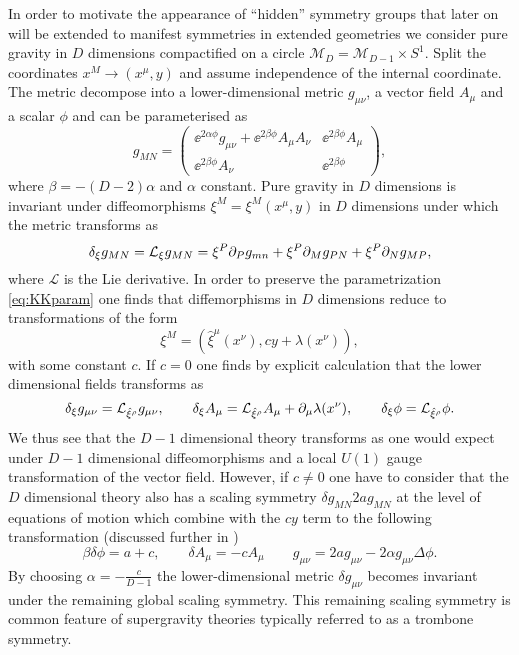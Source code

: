 In order to motivate the appearance of ``hidden'' symmetry groups that later on will be extended to manifest symmetries in extended geometries we consider pure gravity in $D$ dimensions compactified on a circle $\mathcal{M}_D = \mathcal{M}_{D-1}\times S^1$. Split the coordinates $x^M\to (x^\mu,y)$ and assume independence of the internal coordinate. The metric decompose into a lower-dimensional metric $g_{\mu\nu}$, a vector field $A_\mu$ and a scalar $\phi$ and can be parameterised as
\begin{equation}\label{eq:KKparam}
    g_{MN} = \left(\begin{array}{c|c}
                \ee^{2\alpha\phi}g_{\mu\nu}+\ee^{2\beta\phi}A_\mu A_\nu & \ee^{2\beta\phi}A_\mu\\\hline \ee^{2\beta\phi}A_\nu& \ee^{2\beta\phi}
             \end{array}\right),
\end{equation}
where $\beta=-(D-2)\alpha$ and $\alpha$ constant. Pure gravity in $D$ dimensions is invariant under diffeomorphisms $\xi^M=\xi^M(x^\mu,y)$ in $D$ dimensions under which the metric transforms as 
\begin{equation}
    \delta_\xi g_{MN} = \mathcal{L}_\xi g_{MN} = \xi^P\partial_Pg_{mn}+\xi^P\partial_{M}g_{PN}+\xi^P\partial_{N}g_{MP},
\end{equation}
where $\mathcal{L}$ is the Lie derivative. In order to preserve the parametrization \eqref{eq:KKparam} one finds that diffemorphisms in $D$ dimensions reduce to transformations of the form
\begin{equation}
    \xi^M = \left(\hat{\xi}^\mu(x^\nu),cy+\lambda(x^\nu)\right),
\end{equation}
with some constant $c$. If $c=0$ one finds by explicit calculation that the lower dimensional fields transforms as 
\begin{equation}
    \delta_\xi g_{\mu\nu} = \mathcal{L}_{\hat{\xi}^\rho}g_{\mu\nu},\qquad \delta_\xi A_\mu = \mathcal{L}_{\hat{\xi}^\rho}A_{\mu}+\partial_\mu\lambda(x^\nu), \qquad \delta_\xi \phi = \mathcal{L}_{\hat{\xi}^\rho}\phi.
\end{equation}
We thus see that the $D-1$ dimensional theory transforms as one would expect under $D-1$ dimensional diffeomorphisms and a local $U(1)$ gauge transformation of the vector field. However, if $c\neq 0$ one have to consider that the $D$ dimensional theory also has a scaling symmetry $\delta g_{MN} 2ag_{MN}$ at the level of equations of motion which combine with the $cy$ term to the following transformation (discussed further in \cite{PopeKaluzaKlein})
\begin{equation}
    \beta \delta\phi = a+c,\qquad \delta A_\mu = -cA_\mu\qquad g_{\mu\nu} = 2ag_{\mu\nu}-2\alpha g_{\mu\nu}\Delta\phi.
\end{equation}
By choosing $\alpha = -\frac{c}{D-1}$ the lower-dimensional metric $\delta g_{\mu\nu}$ becomes invariant under the remaining global scaling symmetry. This remaining scaling symmetry is common feature of supergravity theories typically referred to as a trombone symmetry. 

